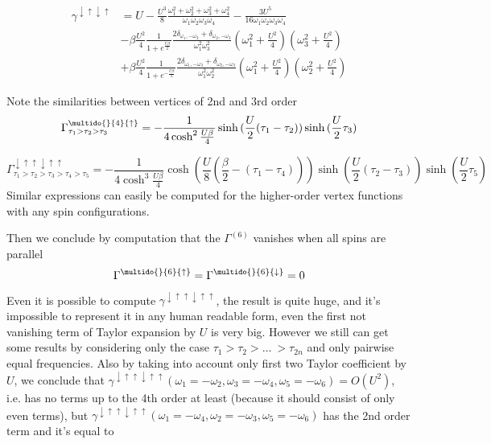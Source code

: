 \begin{equation}\begin{aligned}
 \gamma^{\downarrow\uparrow\downarrow\uparrow} & = 
 U - \frac{U^3}{8}\frac{\omega_1^2+\omega_2^2+\omega_3^2+\omega_4^2}{\omega_1\omega_2\omega_3\omega_4}
   - \frac{3U^5}{16\omega_1\omega_2\omega_3\omega_4} \\
  &- \beta\frac{U^2}{4}\frac{1}{1+e^{\frac{U\beta}{2}}}\frac{2\delta_{\omega_1,-\omega_2}+\delta_{\omega_2,-\omega_3}}{\omega_1^2\omega_3^2}(\omega_1^2+\frac{U^2}{4})(\omega_3^2+\frac{U^2}{4}) \\
  &+ \beta\frac{U^2}{4}\frac{1}{1+e^{-\frac{U\beta}{2}}}\frac{2\delta_{\omega_1,-\omega_3}+\delta_{\omega_2,-\omega_3}}{\omega_1^2\omega_2^2}(\omega_1^2+\frac{U^2}{4})(\omega_2^2+\frac{U^2}{4})   
\end{aligned}\end{equation}

Note the similarities between vertices of 2nd and 3rd order 
\begin{equation}
 \Gamma_{\tau_1>\tau_2>\tau_3}^{\multido{}{4}{\uparrow}} = -\frac{1}{4\cosh^2{\frac{U\beta}{4}}}\sinh{(\frac{U}{2}(\tau_1-\tau_2))}\sinh{(\frac{U}{2}\tau_3)}
\end{equation}

\begin{equation}
\label{Gamma6}
 \Gamma_{\tau_1>\tau_2>\tau_3>\tau_4>\tau_5}^{\downarrow\uparrow\uparrow\downarrow\uparrow\uparrow} = 
    -\frac{1}{4\cosh^3{\frac{U\beta}{4}}}\cosh{(\frac{U}{8}(\frac{\beta}{2}-(\tau_1-\tau_4)))}
      \sinh{(\frac{U}{2}(\tau_2-\tau_3))}\sinh{(\frac{U}{2}\tau_5)}
\end{equation}
Similar expressions can easily be computed for the higher-order vertex functions with any spin configurations.

Then we conclude by computation that the $\Gamma^{(6)}$ vanishes when all spins are parallel
\begin{equation}
 \Gamma^{\multido{}{6}{\uparrow}} = \Gamma^{\multido{}{6}{\downarrow}} = 0
\end{equation}

Even it is possible to compute $\gamma^{\downarrow\uparrow\uparrow\downarrow\uparrow\uparrow}$,
 the result is quite huge, and it's impossible to represent it in any human readable form, even the first not vanishing term of Taylor expansion by $U$ is very big.
However we still can get some results by considering only the case $\tau_1>\tau_2>\dots\ >\tau_{2n}$ and only pairwise equal frequencies.
Also by taking into account only first two Taylor coefficient by $U$, we conclude that
 $\gamma^{\downarrow\uparrow\uparrow\downarrow\uparrow\uparrow}(\omega_1=-\omega_2,\omega_3=-\omega_4,\omega_5=-\omega_6) = O(U^2)$,
 i.e. has no terms up to the 4th order at least (because it should consist of only even terms), but
 $\gamma^{\downarrow\uparrow\uparrow\downarrow\uparrow\uparrow}(\omega_1=-\omega_4,\omega_2=-\omega_3,\omega_5=-\omega_6)$ has the 2nd order term and it's equal to

